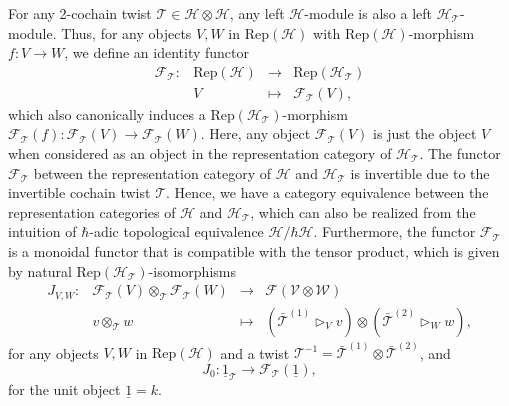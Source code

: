\documentclass[reqno]{amsart}
\theoremstyle{definition}
\theoremstyle{remark}
\begin{document}
For any 2-cochain twist $\mathcal{T} \in \mathscr{H}\otimes \mathscr{H}$, any left $\mathscr{H}$-module is also a left $\mathscr{H}_\mathcal{T}$-module. Thus, for any objects $V,W$ in $\text{Rep}(\mathscr{H})$ with $\text{Rep}(\mathscr{H})$-morphism $f:V\longrightarrow W$, we define an identity functor 
\begin{equation}\label{eq:identity functor}
    \begin{array}{rccc}
{{\mathscr{F}}_{\mathcal{T}}}: & \text{Rep}(\mathscr{H})& \longrightarrow & \text{Rep}(\mathscr{H}_\mathcal{T}) \\
   & V & \longmapsto  & {{\mathscr{F}}_{\mathcal{T}}}(V),
\end{array}
\end{equation}
which also canonically induces a $\text{Rep}(\mathscr{H}_\mathcal{T})$-morphism ${{\mathscr{F}}_{\mathcal{T}}}(f):{{\mathscr{F}}_{\mathcal{T}}}(V)\longrightarrow{{\mathscr{F}}_{\mathcal{T}}}(W)$. Here, any object ${{\mathscr{F}}_{\mathcal{T}}}(V)$ is just the object $V$ when considered as an object in the representation category of $\mathscr{H}_\mathcal{T}$. The functor ${{\mathscr{F}}_{\mathcal{T}}}$ between the representation category of $\mathscr{H}$ and $\mathscr{H}_\mathcal{T}$ is invertible due to the invertible cochain twist $\mathcal{T}$. Hence, we have a category equivalence between the representation categories of $\mathscr{H}$ and $\mathscr{H}_\mathcal{T}$, which can also be realized from the intuition of $\hbar$-adic topological equivalence $\mathscr{H}/\hbar \mathscr{H}$. Furthermore, the functor ${{\mathscr{F}}_{\mathcal{T}}}$ is a monoidal functor that is compatible with the tensor product, which is given by natural $\text{Rep}(\mathscr{H}_\mathcal{T})$-isomorphisms
\begin{equation}
    \begin{array}{rccc}
J_{V,W}: & {{\mathscr{F}}_{\mathcal{T}}}(V)\otimes_\mathcal{T} {{\mathscr{F}}_{\mathcal{T}}}(W)& \longrightarrow & \mathscr{F(V\otimes W)} \\
   & v\otimes_\mathcal{T} w & \longmapsto  & \left(\bar{\mathcal{T}}^{(1)}\triangleright_V v\right)\otimes\left(\bar{\mathcal{T}}^{(2)}\triangleright_W w\right),
\end{array}
\end{equation}
for any objects $V,W$ in $\text{Rep}(\mathscr{H})$ and a twist $\mathcal{T}^{-1} = \bar{\mathcal{T}}^{(1)}\otimes\bar{\mathcal{T}}^{(2)}$, and 
\begin{equation}
    J_0: \underline{1}_\mathcal{T} \longrightarrow {{\mathscr{F}}_{\mathcal{T}}}(\underline{1}),
\end{equation}
for the unit object $\underline{1} = k$.
\end{document}
